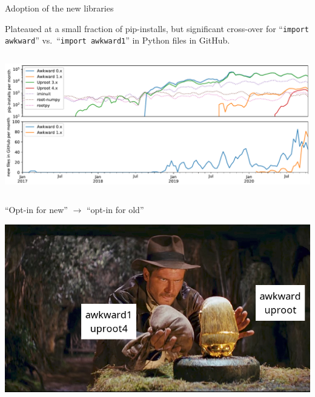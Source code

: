 \documentclass[aspectratio=169]{beamer}
\begin{document}
\begin{frame}{Adoption of the new libraries}
\large
\vspace{0.35 cm}

Plateaued at a small fraction of pip-installs, but significant cross-over for ``\texttt{import awkward}'' vs.\ ``\texttt{import awkward1}'' in Python files in GitHub.

\vspace{0.25 cm}
\begin{columns}
\includegraphics[width=\linewidth]{pip-github-anyone-awkward-uproot.pdf}
\end{columns}
\end{frame}

\begin{frame}{``Opt-in for new'' $\longrightarrow$ ``opt-in for old''}
\vspace{0.35 cm}
\begin{center}
\includegraphics[width=0.8\linewidth]{Raiders-of-the-Lost-Ark-Chamber.jpg}
\end{center}
\end{frame}
\end{document}
